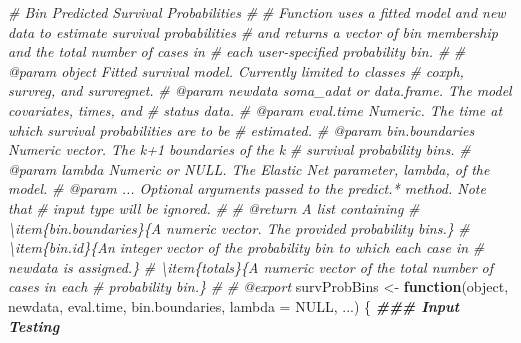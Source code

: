 \documentclass[
]{book}
\newenvironment{Shaded}{\begin{snugshade}}{\end{snugshade}}
\newcommand{\AttributeTok}[1]{\textcolor[rgb]{0.13,0.29,0.53}{#1}}
\newcommand{\CommentTok}[1]{\textcolor[rgb]{0.56,0.35,0.01}{\textit{#1}}}
\newcommand{\ConstantTok}[1]{\textcolor[rgb]{0.56,0.35,0.01}{#1}}
\newcommand{\ControlFlowTok}[1]{\textcolor[rgb]{0.13,0.29,0.53}{\textbf{#1}}}
\newcommand{\DocumentationTok}[1]{\textcolor[rgb]{0.56,0.35,0.01}{\textbf{\textit{#1}}}}
\newcommand{\NormalTok}[1]{#1}
\newcommand{\OtherTok}[1]{\textcolor[rgb]{0.56,0.35,0.01}{#1}}
\begin{document}
\begin{Shaded}
\begin{Highlighting}[]
\CommentTok{\#\textquotesingle{} Bin Predicted Survival Probabilities}
\CommentTok{\#\textquotesingle{} }
\CommentTok{\#\textquotesingle{} Function uses a fitted model and new data to estimate survival probabilities}
\CommentTok{\#\textquotesingle{}   and returns a vector of bin membership and the total number of cases in}
\CommentTok{\#\textquotesingle{}   each user{-}specified probability bin.}
\CommentTok{\#\textquotesingle{}   }
\CommentTok{\#\textquotesingle{} @param object Fitted survival model. Currently limited to classes}
\CommentTok{\#\textquotesingle{}   \textasciigrave{}coxph\textasciigrave{}, \textasciigrave{}survreg\textasciigrave{}, and \textasciigrave{}survregnet\textasciigrave{}.}
\CommentTok{\#\textquotesingle{} @param newdata soma\_adat or data.frame. The model covariates, times, and}
\CommentTok{\#\textquotesingle{}   status data.}
\CommentTok{\#\textquotesingle{} @param eval.time Numeric. The time at which survival probabilities are to be}
\CommentTok{\#\textquotesingle{}   estimated.}
\CommentTok{\#\textquotesingle{} @param bin.boundaries Numeric vector. The k+1 boundaries of the k}
\CommentTok{\#\textquotesingle{}   survival probability bins.}
\CommentTok{\#\textquotesingle{} @param lambda Numeric or NULL. The Elastic Net parameter, lambda, of the model. }
\CommentTok{\#\textquotesingle{} @param ... Optional arguments passed to the \textasciigrave{}predict.*\textasciigrave{} method. Note that}
\CommentTok{\#\textquotesingle{}   input \textasciigrave{}type\textasciigrave{} will be ignored.}
\CommentTok{\#\textquotesingle{} }
\CommentTok{\#\textquotesingle{} @return A list containing}
\CommentTok{\#\textquotesingle{} \textbackslash{}item\{bin.boundaries\}\{A numeric vector. The provided probability bins.\}}
\CommentTok{\#\textquotesingle{} \textbackslash{}item\{bin.id\}\{An integer vector of the probability bin to which each case in }
\CommentTok{\#\textquotesingle{}   \textasciigrave{}newdata\textasciigrave{} is assigned.\}}
\CommentTok{\#\textquotesingle{} \textbackslash{}item\{totals\}\{A numeric vector of the total number of cases in each }
\CommentTok{\#\textquotesingle{}   probability bin.\}}
\CommentTok{\#\textquotesingle{} }
\CommentTok{\#\textquotesingle{} @export}
\NormalTok{survProbBins }\OtherTok{\textless{}{-}} \ControlFlowTok{function}\NormalTok{(object, newdata, eval.time, bin.boundaries, }
                         \AttributeTok{lambda =} \ConstantTok{NULL}\NormalTok{, ...) \{ }
  \DocumentationTok{\#\#\# Input Testing}

\end{Highlighting}
\end{Shaded}
\end{document}
